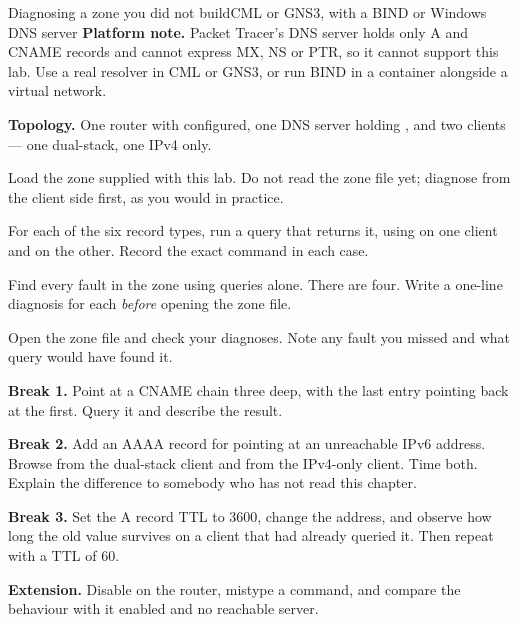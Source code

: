\begin{lab}{Diagnosing a zone you did not build}{CML or GNS3, with a BIND or Windows DNS server}
\textbf{Platform note.} Packet Tracer's DNS server holds only A and CNAME records
and cannot express MX, NS or PTR, so it cannot support this lab. Use a real
resolver in CML or GNS3, or run BIND in a container alongside a virtual network.

\textbf{Topology.} One router with  configured, one DNS
server holding , and two clients --- one dual-stack, one IPv4
only.

\begin{tasks}
  \item Load the zone supplied with this lab. Do not read the zone file yet;
        diagnose from the client side first, as you would in practice.
  \item For each of the six record types, run a query that returns it, using
         on one client and  on the other. Record the exact
        command in each case.
  \item Find every fault in the zone using queries alone. There are four. Write a
        one-line diagnosis for each \emph{before} opening the zone file.
  \item Open the zone file and check your diagnoses. Note any fault you missed
        and what query would have found it.
  \item \textbf{Break 1.} Point  at a CNAME chain three deep, with the
        last entry pointing back at the first. Query it and describe the result.
  \item \textbf{Break 2.} Add an AAAA record for  pointing at an
        unreachable IPv6 address. Browse from the dual-stack client and from the
        IPv4-only client. Time both. Explain the difference to somebody who has
        not read this chapter.
  \item \textbf{Break 3.} Set the A record TTL to 3600, change the address, and
        observe how long the old value survives on a client that had already
        queried it. Then repeat with a TTL of 60.
  \item \textbf{Extension.} Disable  on the router, mistype
        a command, and compare the behaviour with it enabled and no reachable
        server.
\end{tasks}
\end{lab}

